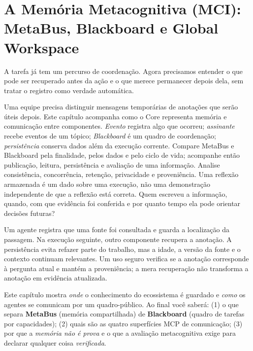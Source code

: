 \thispagestyle{fancy}
\chapter{A Memória Metacognitiva (MCI): MetaBus, Blackboard e Global Workspace}

A tarefa já tem um percurso de coordenação. Agora precisamos entender o que pode ser recuperado antes da ação e o que merece permanecer depois dela, sem tratar o registro como verdade automática.


\roteirodidatico
{Uma equipe precisa distinguir mensagens temporárias de anotações que serão úteis depois. Este capítulo acompanha como o Core representa memória e comunicação entre componentes.}
{\emph{Evento} registra algo que ocorreu; \emph{assinante} recebe eventos de um tópico; \emph{Blackboard} é um quadro de coordenação; \emph{persistência} conserva dados além da execução corrente.}
{Compare MetaBus e Blackboard pela finalidade, pelos dados e pelo ciclo de vida; acompanhe então publicação, leitura, persistência e avaliação de uma informação.}
{Analise consistência, concorrência, retenção, privacidade e proveniência. Uma reflexão armazenada é um dado sobre uma execução, não uma demonstração independente de que a reflexão está correta.}
{Quem escreveu a informação, quando, com que evidência foi conferida e por quanto tempo ela pode orientar decisões futuras?}

{Um agente registra que uma fonte foi consultada e guarda a localização da passagem. Na execução seguinte, outro componente recupera a anotação. A persistência evita refazer parte do trabalho, mas a idade, a versão da fonte e o contexto continuam relevantes. Um uso seguro verifica se a anotação corresponde à pergunta atual e mantém a proveniência; a mera recuperação não transforma a anotação em evidência atualizada.}

\begin{resultado}
Este capítulo mostra \emph{onde} o conhecimento do ecossistema é guardado e
\emph{como} os agentes se comunicam por um quadro-público. Ao final você saberá:
(1) o que separa \textbf{MetaBus} (memória compartilhada) de \textbf{Blackboard}
(quadro de tarefas por capacidades); (2) quais são as quatro superfícies MCP de
comunicação; (3) por que a \emph{memória não é prova} e o que a avaliação
metacognitiva exige para declarar qualquer coisa \emph{verificada}.
\end{resultado}

